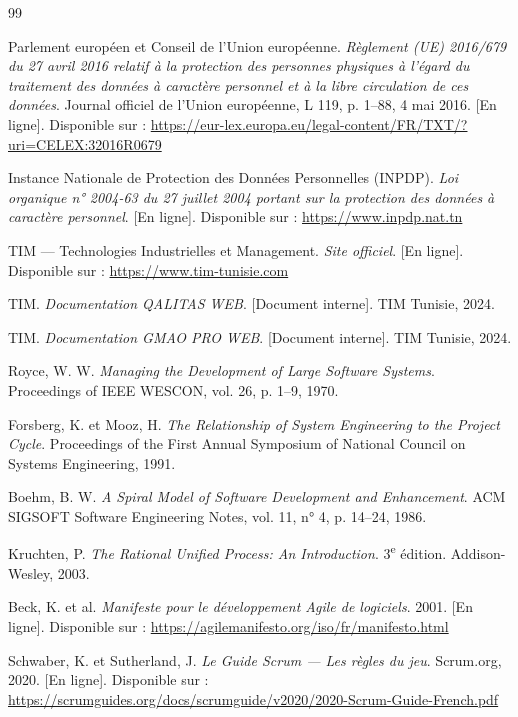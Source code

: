 \documentclass[12pt,a4paper]{report}
\begin{document}
\renewcommand{\bibname}{Références}
\begin{thebibliography}{99}

Parlement européen et Conseil de l'Union européenne. \textit{Règlement (UE) 2016/679 du 27 avril 2016 relatif à la protection des personnes physiques à l'égard du traitement des données à caractère personnel et à la libre circulation de ces données}. Journal officiel de l'Union européenne, L 119, p. 1--88, 4 mai 2016. [En ligne]. Disponible sur : \url{https://eur-lex.europa.eu/legal-content/FR/TXT/?uri=CELEX:32016R0679}

Instance Nationale de Protection des Données Personnelles (INPDP). \textit{Loi organique n° 2004-63 du 27 juillet 2004 portant sur la protection des données à caractère personnel}. [En ligne]. Disponible sur : \url{https://www.inpdp.nat.tn}

TIM --- Technologies Industrielles et Management. \textit{Site officiel}. [En ligne]. Disponible sur : \url{https://www.tim-tunisie.com}

TIM. \textit{Documentation QALITAS WEB}. [Document interne]. TIM Tunisie, 2024.

TIM. \textit{Documentation GMAO PRO WEB}. [Document interne]. TIM Tunisie, 2024.

Royce, W. W. \textit{Managing the Development of Large Software Systems}. Proceedings of IEEE WESCON, vol. 26, p. 1--9, 1970.

Forsberg, K. et Mooz, H. \textit{The Relationship of System Engineering to the Project Cycle}. Proceedings of the First Annual Symposium of National Council on Systems Engineering, 1991.

Boehm, B. W. \textit{A Spiral Model of Software Development and Enhancement}. ACM SIGSOFT Software Engineering Notes, vol. 11, n° 4, p. 14--24, 1986.

Kruchten, P. \textit{The Rational Unified Process: An Introduction}. 3\textsuperscript{e} édition. Addison-Wesley, 2003.

Beck, K. et al. \textit{Manifeste pour le développement Agile de logiciels}. 2001. [En ligne]. Disponible sur : \url{https://agilemanifesto.org/iso/fr/manifesto.html}

Schwaber, K. et Sutherland, J. \textit{Le Guide Scrum --- Les règles du jeu}. Scrum.org, 2020. [En ligne]. Disponible sur : \url{https://scrumguides.org/docs/scrumguide/v2020/2020-Scrum-Guide-French.pdf}


\end{thebibliography}
\end{document}
